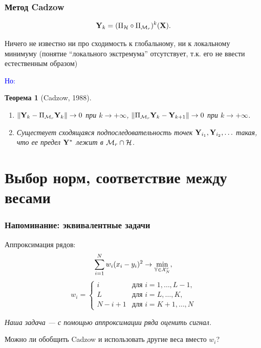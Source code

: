 \documentclass[unicode, notheorems]{beamer}
\newtheorem{theorem}{Теорема}
\begin{document}
\begin{frame}
	\frametitle{Метод Cadzow}
	\begin{equation*}
	\mathbf{Y}_k = (\Pi_{\mathcal{H}} \circ \Pi_{\mathcal{M}_r})^k (\mathbf{X}).
	\end{equation*}
	
	Ничего не известно ни про сходимость к глобальному, ни к локальному минимуму (понятие ``локального экстремума'' отсутствует, т.к. его не ввести естественным образом)

	\textcolor{blue}{Но:} 

	\begin{theorem}[Cadzow, 1988]
		\begin{enumerate}
			\item $\|\mathbf{Y}_k - \Pi_{\mathcal{M}_r} \mathbf{Y}_k\| \to 0$ при $k \to +\infty$, $\|\Pi_{\mathcal{M}_r}\mathbf{Y}_k - \mathbf{Y}_{k+1}\| \to 0$ при $k \to +\infty$.
			\item Существует сходящаяся подпоследовательность точек $\mathbf{Y}_{i_1}, \mathbf{Y}_{i_2}, \ldots$ такая, что ее предел $\mathbf{Y}^*$  лежит в $\mathcal{M}_r \cap \mathcal{H}$.
		\end{enumerate}
	\end{theorem}
\end{frame}

\section{Выбор норм, соответствие между весами}
\begin{frame}
\frametitle{Напоминание: эквивалентные задачи}
Аппроксимация рядов:
\begin{equation*}
\sum \limits_{i=1}^N w_i(x_i - y_i)^2 \to \min_{\mathbb{Y} \in \mathcal{X}_N^r},
\end{equation*}
\begin{equation*}
w_i = \begin{cases}
i & \text{для $i = 1, \ldots, L-1,$}\\
L & \text{для $i = L, \ldots, K,$}\\
N - i + 1 & \text{для $i = K + 1, \ldots, N$}
\end{cases}
\end{equation*}

	\vspace{0.4cm}
\textit{Наша задача --- с помощью аппроксимации ряда оценить сигнал.}

	\vspace{0.4cm}
Можно ли обобщить Cadzow и использовать другие веса вместо $w_i$?
\end{frame}
\end{document}
